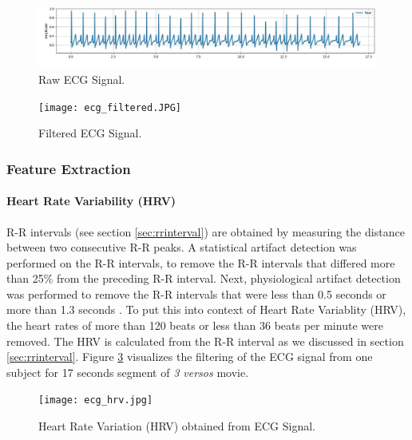 \begin{figure}
    \centering
    \includegraphics[width=140mm]{Figures/ecg_raw.jpg}
    \caption{Raw ECG Signal.}
    \label{fig:ecg_raw}
\end{figure}

\begin{figure}
    \centering
    \texttt{[image: ecg\_filtered.JPG]}
    \caption{Filtered ECG Signal.}
    \label{fig:ecg_filtered}
\end{figure}



\subsubsection{Feature Extraction} 
\label{sec:ecg_fet_ext}
\paragraph{Heart Rate Variability (HRV)} R-R intervals (see section \ref{sec:rrinterval}) are obtained by measuring the distance between two consecutive R-R peaks. A statistical artifact detection was performed on the R-R intervals, to remove the R-R intervals that differed more than 25\% from the preceding R-R interval. Next, physiological artifact detection was performed to remove the R-R intervals that were less than 0.5 seconds or more than 1.3 seconds \cite{noauthor_normal_2018}. To put this into context of Heart Rate Variablity (HRV), the heart rates of more than 120 beats or less than 36 beats per minute were removed. The HRV is calculated from the R-R interval as we discussed in section \ref{sec:rrinterval}. Figure \ref{fig:ecg_hrv} visualizes the filtering of the ECG signal from one subject for 17 seconds segment of \textit{3 versos} movie.

\begin{figure}
    \centering
    \texttt{[image: ecg\_hrv.jpg]}
    \caption{Heart Rate Variation (HRV) obtained from ECG Signal.}
    \label{fig:ecg_hrv}
\end{figure}

